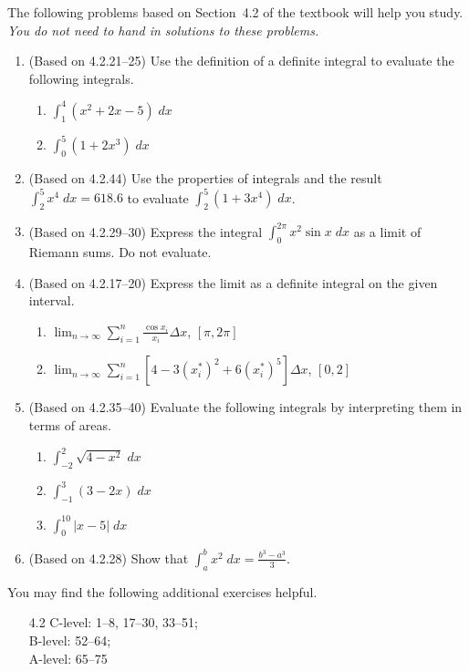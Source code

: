 \documentclass{article}
\title{\commonPSTitleZeroFourTwo}
\author{\commonAuthor}
\date{\commonDateZeroFourTwo}
\newcommand{\ds}{\displaystyle}
\begin{document}
\maketitle
\thispagestyle{empty}

\noindent
The following problems based on Section~4.2 of the textbook will help
you study.  \emph{You do not need to hand in solutions to these
  problems.}
\begin{enumerate}
\item (Based on 4.2.21--25) %
  Use the definition of a definite integral to evaluate the following
  integrals.
  \begin{multicols}{2}
  \begin{enumerate}
  \item $\ds \int_1^4 (x^2+2x-5)\; dx$
  \item $\ds \int_0^5 (1+2x^3) \; dx$
  \end{enumerate}
  \end{multicols}
\item (Based on 4.2.44) %
  Use the properties of integrals and the result $\ds\int_2^5 x^4\; dx=618.6$
  to evaluate $\ds\int_2^5 (1+3x^4) \; dx$.
\item (Based on 4.2.29--30)
  Express the integral $\ds \int_0^{2\pi} x^2 \sin x \; dx$
  as a limit of Riemann sums.  Do not evaluate.
\item (Based on 4.2.17--20) %
  Express the limit as a definite integral on the given interval.
  \begin{multicols}{2}
  \begin{enumerate}
  \item $\ds\lim_{n\to\infty}\sum_{i=1}^n \frac{\cos x_i}{x_i} \Delta x$,
    $[\pi,2\pi]$
  \item $\ds\lim_{n\to\infty}\sum_{i=1}^n [4-3(x_i^*)^2+6(x_i^*)^5]\Delta x$,
    $[0,2]$
  \end{enumerate}
  \end{multicols}
\item (Based on 4.2.35--40) %
  Evaluate the following integrals by interpreting them in terms of
  areas.
  \begin{multicols}{3}
  \begin{enumerate}
  \item $\ds\int_{-2}^2 \sqrt{4-x^2} \; dx$
  \item $\ds\int_{-1}^3 (3-2x) \; dx$
  \item $\ds\int_0^{10} |x-5| \; dx$
  \end{enumerate}
  \end{multicols}
\item (Based on 4.2.28) %
  Show that $\ds \int_a^b x^2 \; dx = \frac{b^3-a^3}{3}$.
\end{enumerate}

\noindent
You may find the following additional exercises helpful.
\begin{itemize}
\item[4.2]
  C-level: 1--8, 17--30, 33--51; \\
  B-level: 52--64; \\
  A-level: 65--75
\end{itemize}
\end{document}
